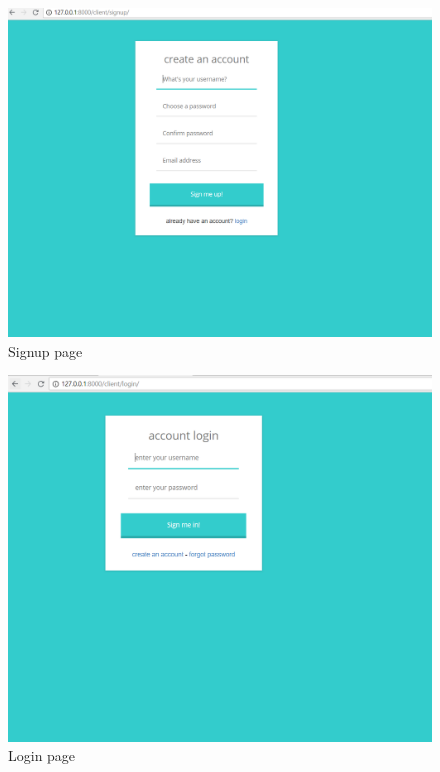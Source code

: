 \documentclass{report}
\begin{document}
\begin{figure}[h]
    \centering
    \includegraphics[scale=0.295]{sign_up.PNG}
    \caption{Signup page}
    \label{fig:Signup page}
\end{figure}

\begin{figure}[h]
    \centering
    \includegraphics[scale=0.295]{log_in.PNG}
    \caption{Login page}
    \label{fig:Login page}
\end{figure}
\end{document}
